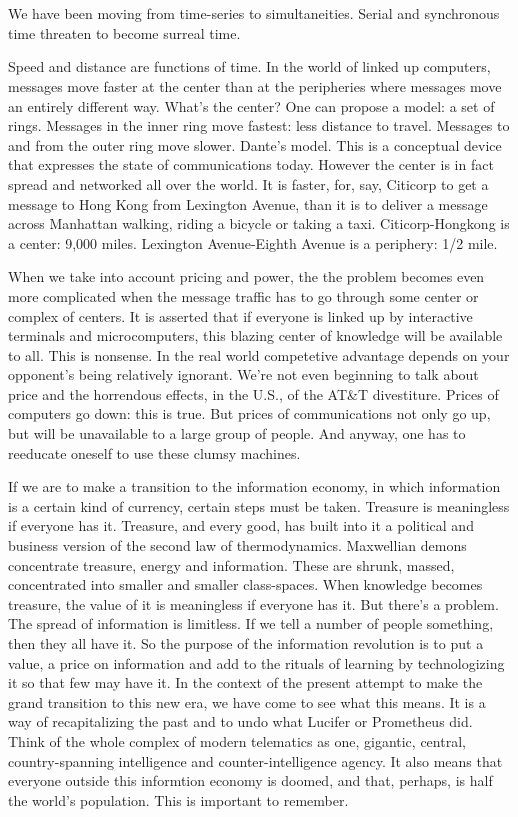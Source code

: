 \chapter{}%

We have been moving from time-series to simultaneities. Serial and synchronous time threaten to become surreal time.

Speed and distance are functions of time. In the world of linked up computers, messages move faster at the center than at the peripheries where messages move an entirely different way. What's the center? One can propose a model: a set of rings. Messages in the inner ring move fastest: less distance to travel. Messages to and from the outer ring move slower. Dante's model. This is a conceptual device that expresses the state of communications today. However the center is in fact spread and networked all over the world. It is faster, for, say, Citicorp to get a message to Hong Kong from Lexington Avenue, than it is to deliver a message across Manhattan walking, riding a bicycle or taking a taxi. Citicorp-Hongkong is a center: 9,000 miles. Lexington Avenue-Eighth Avenue is a periphery: 1/2 mile.

When we take into account pricing and power, the the problem becomes even more complicated when the message traffic has to go through some center or complex of centers. It is asserted that if everyone is linked up by interactive terminals and microcomputers, this blazing center of knowledge will be available to all. This is nonsense. In the real world competetive advantage depends on your opponent's being relatively ignorant. We're not even beginning to talk about price and the horrendous effects, in the U.S., of the AT\&T divestiture. Prices of computers go down: this is true. But prices of communications not only go up, but will be unavailable to a large group of people. And anyway, one has to reeducate oneself to use these clumsy machines.

If we are to make a transition to the information economy, in which information is a certain kind of currency, certain steps must be taken. Treasure is meaningless if everyone has it. Treasure, and every good, has built into it a political and business version of the second law of thermodynamics. Maxwellian demons concentrate treasure, energy and information. These are shrunk, massed, concentrated into smaller and smaller class-spaces. When knowledge becomes treasure, the value of it is meaningless if everyone has it. But there's a problem. The spread of information is limitless. If we tell a number of people something, then they all have it. So the purpose of the information revolution is to put a value, a price on information and add to the rituals of learning by technologizing it so that few may have it. In the context of the present attempt to make the grand transition to this new era, we have come to see what this means. It is a way of recapitalizing the past and to undo what Lucifer or Prometheus did. Think of the whole complex of modern telematics as one, gigantic, central, country-spanning intelligence and counter-intelligence agency. It also means that everyone outside this informtion economy is doomed, and that, perhaps, is half the world's population. This is important to remember.

